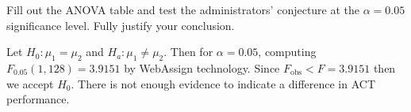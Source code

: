 Fill out the ANOVA table and test the administrators' conjecture at the $\alpha =0.05$ significance level. Fully justify your conclusion.

\soln* 
{}
Let $H_0 : \mu_1 = \mu_2$ and $H_a : \mu_1 \neq \mu_2$. Then for $\alpha = 0.05$, computing $F_{0.05}(1, 128) = 3.9151$ by WebAssign technology. Since $F_{\text{obs}} < F = 3.9151$ then we accept $H_0$. There is not enough evidence to indicate a difference in ACT performance.